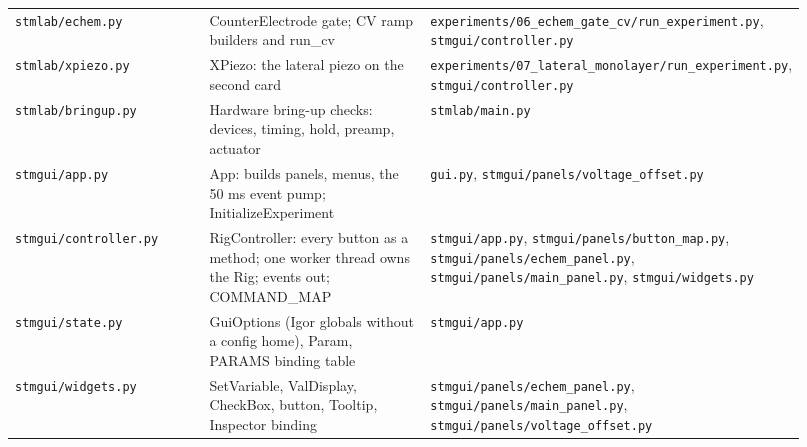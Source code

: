 \begin{longtable}{@{}>{\raggedright\arraybackslash}p{0.230\linewidth}>{\raggedright\arraybackslash}p{0.058\linewidth}>{\raggedright\arraybackslash}p{0.403\linewidth}>{\raggedright\arraybackslash}p{0.230\linewidth}@{}}
\texttt{stmlab/\discretionary{}{}{}echem.\discretionary{}{}{}py} & 332 & CounterElectrode gate; CV ramp builders and run\_cv & \texttt{experiments/\discretionary{}{}{}06\_\discretionary{}{}{}echem\_\discretionary{}{}{}gate\_\discretionary{}{}{}cv/\discretionary{}{}{}run\_\discretionary{}{}{}experiment.\discretionary{}{}{}py}, \texttt{stmgui/\discretionary{}{}{}controller.\discretionary{}{}{}py} \\
\texttt{stmlab/\discretionary{}{}{}xpiezo.\discretionary{}{}{}py} & 128 & XPiezo: the lateral piezo on the second card & \texttt{experiments/\discretionary{}{}{}07\_\discretionary{}{}{}lateral\_\discretionary{}{}{}monolayer/\discretionary{}{}{}run\_\discretionary{}{}{}experiment.\discretionary{}{}{}py}, \texttt{stmgui/\discretionary{}{}{}controller.\discretionary{}{}{}py} \\
\texttt{stmlab/\discretionary{}{}{}bringup.\discretionary{}{}{}py} & 464 & Hardware bring-up checks: devices, timing, hold, preamp, actuator & \texttt{stmlab/\discretionary{}{}{}main.\discretionary{}{}{}py} \\
\texttt{stmgui/\discretionary{}{}{}app.\discretionary{}{}{}py} & 324 & App: builds panels, menus, the 50 ms event pump; InitializeExperiment & \texttt{gui.\discretionary{}{}{}py}, \texttt{stmgui/\discretionary{}{}{}panels/\discretionary{}{}{}voltage\_\discretionary{}{}{}offset.\discretionary{}{}{}py} \\
\texttt{stmgui/\discretionary{}{}{}controller.\discretionary{}{}{}py} & 1278 & RigController: every button as a method; one worker thread owns the Rig; events out; COMMAND\_MAP & \texttt{stmgui/\discretionary{}{}{}app.\discretionary{}{}{}py}, \texttt{stmgui/\discretionary{}{}{}panels/\discretionary{}{}{}button\_\discretionary{}{}{}map.\discretionary{}{}{}py}, \texttt{stmgui/\discretionary{}{}{}panels/\discretionary{}{}{}echem\_\discretionary{}{}{}panel.\discretionary{}{}{}py}, \texttt{stmgui/\discretionary{}{}{}panels/\discretionary{}{}{}main\_\discretionary{}{}{}panel.\discretionary{}{}{}py}, \texttt{stmgui/\discretionary{}{}{}widgets.\discretionary{}{}{}py} \\
\texttt{stmgui/\discretionary{}{}{}state.\discretionary{}{}{}py} & 337 & GuiOptions (Igor globals without a config home), Param, PARAMS binding table & \texttt{stmgui/\discretionary{}{}{}app.\discretionary{}{}{}py} \\
\texttt{stmgui/\discretionary{}{}{}widgets.\discretionary{}{}{}py} & 331 & SetVariable, ValDisplay, CheckBox, button, Tooltip, Inspector binding & \texttt{stmgui/\discretionary{}{}{}panels/\discretionary{}{}{}echem\_\discretionary{}{}{}panel.\discretionary{}{}{}py}, \texttt{stmgui/\discretionary{}{}{}panels/\discretionary{}{}{}main\_\discretionary{}{}{}panel.\discretionary{}{}{}py}, \texttt{stmgui/\discretionary{}{}{}panels/\discretionary{}{}{}voltage\_\discretionary{}{}{}offset.\discretionary{}{}{}py} \\

\end{longtable}
